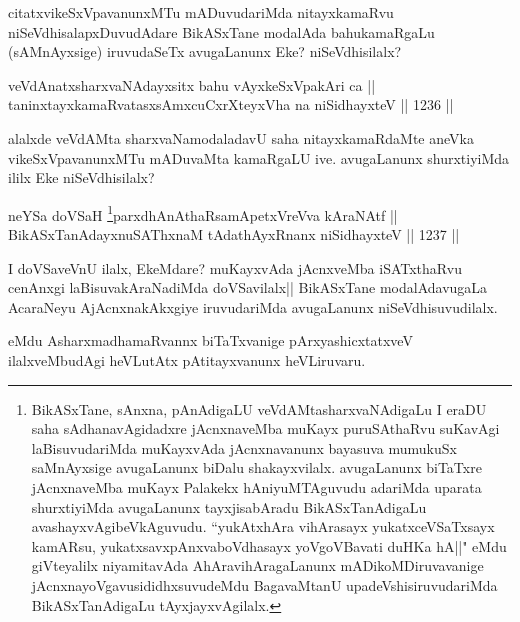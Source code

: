 \begin{artha}
citatxvikeSxVpavanunxMTu mADuvudariMda nitayxkamaRvu niSeVdhisalapxDuvudAdare BikASxTane modalAda bahukamaRgaLu (sAMnAyxsige) iruvudaSeTx avugaLanunx Eke? niSeVdhisilalx?
\end{artha}

\begin{shl}
veVdAnatxsharxvaNAdayxsitx bahu vAyxkeSxVpakAri ca ||  \\
taninxtayxkamaRvatasxsAmxcuCxrXteyxVha na niSidhayxteV \hfill || 1236 ||  
\end{shl}

\begin{artha}
alalxde veVdAMta sharxvaNamodaladavU saha nitayxkamaRdaMte aneVka vikeSxVpavanunxMTu mADuvaMta kamaRgaLU ive. avugaLanunx shurxtiyiMda ililx Eke niSeVdhisilalx?
\end{artha}



\begin{shl}
neYSa doVSaH \footnote{BikASxTane, sAnxna, pAnAdigaLU veVdAMtasharxvaNAdigaLu I eraDU saha sAdhanavAgidadxre jAcnxnaveMba muKayx puruSAthaRvu suKavAgi laBisuvudariMda muKayxvAda jAcnxnavanunx bayasuva mumukuSx saMnAyxsige avugaLanunx biDalu shakayxvilalx. avugaLanunx biTaTxre jAcnxnaveMba muKayx Palakekx hAniyuMTAguvudu adariMda uparata shurxtiyiMda avugaLanunx tayxjisabAradu BikASxTanAdigaLu avashayxvAgibeVkAguvudu. ``yukAtxhAra vihArasayx yukatxceVSaTxsayx kamARsu, yukatxsavxpAnxvaboVdhasayx yoVgoVBavati duHKa hA||" eMdu giVteyalilx niyamitavAda AhAravihAragaLanunx mADikoMDiruvavanige jAcnxnayoVgavusididhxsuvudeMdu BagavaMtanU upadeVshisiruvudariMda BikASxTanAdigaLu tAyxjayxvAgilalx.}parxdhAnAthaRsamApetxVreVva kAraNAtf || \\
BikASxTanAdayxnuSAThxnaM tAdathAyxRnanx niSidhayxteV \hfill || 1237 ||  
\end{shl}

\begin{artha}
I doVSaveVnU ilalx, EkeMdare? muKayxvAda jAcnxveMba iSATxthaRvu cenAnxgi laBisuvakAraNadiMda doVSavilalx|| BikASxTane modalAdavugaLa AcaraNeyu AjAcnxnakAkxgiye iruvudariMda avugaLanunx niSeVdhisuvudilalx.
\end{artha}

\begin{artha}
eMdu AsharxmadhamaRvannx biTaTxvanige pArxyashicxtatxveV ilalxveMbudAgi heVLutAtx pAtitayxvanunx heVLiruvaru.
\end{artha}

